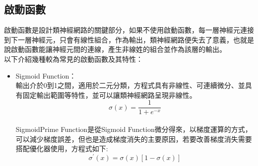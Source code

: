 \documentclass[14pt,a4paper]{report}  %
\begin{document}
\subsection{啟動函數}
啟動函數是設計類神經網路的關鍵部分，如果不使用啟動函數，每一層神經元連接到下一層神經元，只會有線性組合，作為輸出，類神經網路便失去了意義，也就是說啟動函數能讓神經元間的連線，產生非線姓的組合並作為該層的輸出。\\
以下介紹幾種較為常見的啟動函數及其特性：
\begin{itemize}
\item Sigmoid Function：\\
輸出介於0到1之間，適用於二元分類，方程式具有非線性、可連續微分、並具有固定輸出範圍等特性，並可以讓類神經網路呈現非線性。\\
$$\sigma(x)=\frac{1}{1+e^{-x}}$$ \\[6pt]

SigmoidPrime Function是從Sigmoid Function微分得來，以梯度運算的方式，可以減少梯度誤差，但也是造成梯度消失的主要原因，若要改善梯度消失需要搭配優化器使用，方程式如下:\\[12pt]
$$\sigma^{'}(x)=\sigma(x)[1-\sigma(x)]$$\\[3pt]

\end{itemize}
\end{document}
